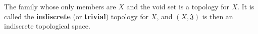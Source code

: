 The family whose only members are $X$ and the void set is a topology for $X$. It is called the \textbf{indiscrete} (or \textbf{trivial}) topology for $X$, and $(X, \mathfrak{J})$ is then an indiscrete topological space.

